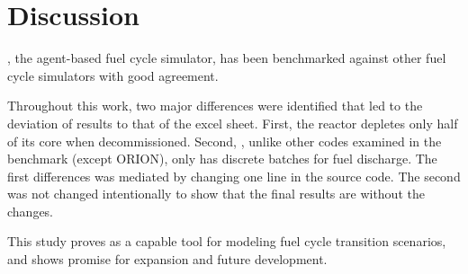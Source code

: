 \section{Discussion}

\Cyclus, the agent-based fuel cycle simulator,
has been benchmarked against other fuel cycle
simulators with good agreement.

Throughout this work, two major differences were identified
that led to the deviation
of \Cyclus results to that of the excel sheet. First,
the \Cycamore reactor depletes only half of its core
when decommissioned. Second, \Cyclus, unlike other
codes examined in the benchmark (except ORION), only has
discrete batches for fuel discharge.
The first differences was mediated by changing one line in
the source code. The second was not changed intentionally
to show that the final results are without the changes.

This study proves \Cyclus as a capable tool for modeling
fuel cycle transition scenarios, and shows promise for
expansion and future development.   